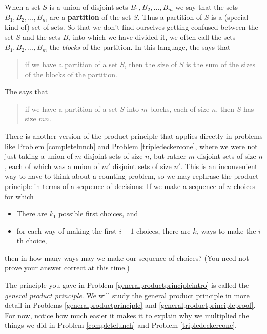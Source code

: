 When a set $S$ is a union of disjoint sets $B_1, B_2, \ldots, B_m$ we say
that the sets $B_1, B_2, \ldots, B_m$ are a {\bf
partition} of the set
$S$.  Thus a partition of $S$ is a (special kind of) set of sets.  So that
we don't find ourselves getting confused between the set $S$ and the sets
$B_i$ into which we have divided it, we often call the sets $B_1, B_2,
\ldots, B_m$ the {\em blocks} of the partition.  In this language, the
 says that 
\begin{quote}if we have a partition of a set $S$, then the size of $S$ is the
sum of the sizes of the blocks of the partition.\end{quote}  The
 says
that
\begin{quote}if we have a partition of a set $S$ into $m$ blocks, each of size
$n$, then
$S$ has size $mn$.\end{quote}
There is another version of the product principle that applies directly in
problems like Problem \ref{completelunch} and Problem \ref{tripledeckercone},
where we were not just taking a union of $m$ disjoint sets of size $n$, but
rather $m$ disjoint sets of size $n$, each of which was a union of $m'$
disjoint sets of size $n'$.  This is an inconvenient way to have to think
about a counting problem, so we may rephrase the product principle in terms
of a sequence of decisions:
\bp 
\itemm If we make a sequence of $n$   choices for
which\label{generalproductprincipleintro}
\begin{itemize} 
\item There are $k_1$ possible first choices, and
\item for each way of making the first $i-1$ choices, there are $k_i$ ways to
make the $i$th choice,
\end{itemize}
then in how many ways may we
make our sequence of choices?  (You need not prove your answer correct at
this time.)
\ep
 
  The principle you gave in Problem \ref{generalproductprincipleintro} is
called the {\em general product principle}.
 We will study the general  product principle in more detail in
Problems
\ref{generalproductprinciple} and \ref{generalproductprincipleproof}.  For
now, notice how much easier it makes it to explain why we multiplied the
things we did in Problem
\ref{completelunch} and Problem \ref{tripledeckercone}.
\bp

